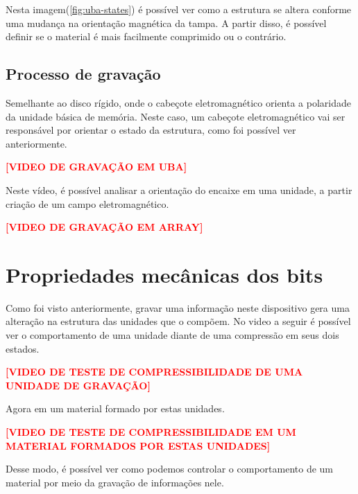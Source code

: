 Nesta imagem(\ref{fig:uba-states}) é possível ver como a estrutura se altera conforme uma mudança na orientação magnética da tampa. A partir disso, é possível definir se o material é mais facilmente comprimido ou o contrário.

\subsection{Processo de gravação}

Semelhante ao disco rígido, onde o cabeçote eletromagnético orienta a polaridade da unidade básica de memória. Neste caso, um cabeçote eletromagnético vai ser responsável por orientar o estado da estrutura, como foi possível ver anteriormente.

\begin{center}
\textcolor{red}{\textbf{[VIDEO DE GRAVAÇÃO EM UBA]}}
\end{center}

Neste vídeo, é possível analisar a orientação do encaixe em uma unidade, a partir criação de um campo eletromagnético.

\begin{center}
\textcolor{red}{\textbf{[VIDEO DE GRAVAÇÃO EM ARRAY]}}
\end{center}


\section{Propriedades mecânicas dos bits}

Como foi visto anteriormente, gravar uma informação neste dispositivo gera uma alteração na estrutura das unidades que o compõem. No video a seguir é possível ver o comportamento de uma unidade diante de uma compressão em seus dois estados. 

\begin{center}
\textcolor{red}{\textbf{[VIDEO DE TESTE DE COMPRESSIBILIDADE DE UMA UNIDADE DE GRAVAÇÃO]}}
\end{center}
    
Agora em um material formado por estas unidades. 

\begin{center}
\textcolor{red}{\textbf{[VIDEO DE TESTE DE COMPRESSIBILIDADE EM UM MATERIAL FORMADOS POR ESTAS UNIDADES]}}
\end{center}

Desse modo, é possível ver como podemos controlar o comportamento de um material por meio da gravação de informações nele. 